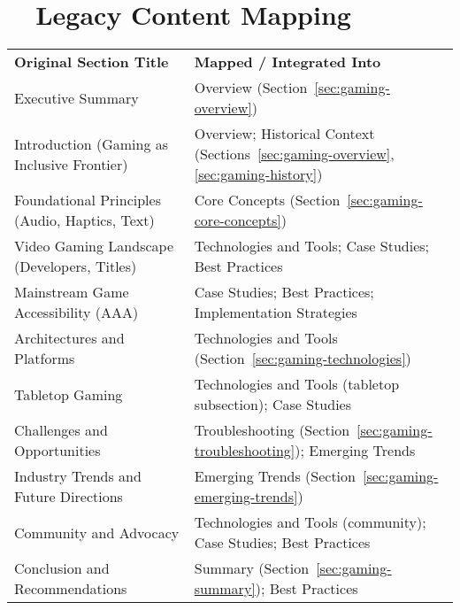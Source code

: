 \section{~~Legacy Content Mapping}
\label{sec:gaming-legacy-mapping}
\begin{tabular}{p{} p{}}
	\textbf{Original Section Title}                & \textbf{Mapped / Integrated Into}                                                           \\
	Executive Summary                              & Overview (Section~\ref{sec:gaming-overview})                                                \\
	Introduction (Gaming as Inclusive Frontier)    & Overview; Historical Context (Sections~\ref{sec:gaming-overview}, \ref{sec:gaming-history}) \\
	Foundational Principles (Audio, Haptics, Text) & Core Concepts (Section~\ref{sec:gaming-core-concepts})                                      \\
	Video Gaming Landscape (Developers, Titles)    & Technologies and Tools; Case Studies; Best Practices                                        \\
	Mainstream Game Accessibility (AAA)            & Case Studies; Best Practices; Implementation Strategies                                     \\
	Architectures and Platforms                    & Technologies and Tools (Section~\ref{sec:gaming-technologies})                              \\
	Tabletop Gaming                                & Technologies and Tools (tabletop subsection); Case Studies                                  \\
	Challenges and Opportunities                   & Troubleshooting (Section~\ref{sec:gaming-troubleshooting}); Emerging Trends                 \\
	Industry Trends and Future Directions          & Emerging Trends (Section~\ref{sec:gaming-emerging-trends})                                  \\
	Community and Advocacy                         & Technologies and Tools (community); Case Studies; Best Practices                            \\
	Conclusion and Recommendations                 & Summary (Section~\ref{sec:gaming-summary}); Best Practices                                  \\
\end{tabular}


